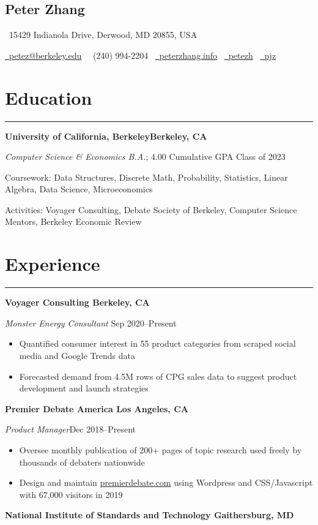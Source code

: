 \documentclass[11pt]{article}
\newcommand{\name}[1]{\begin{center}\section*{\huge \color{highlight} #1}\vspace{-0.5cm}\end{center}}
\newcommand{\topinfo}[1]{\begin{center}\vspace{-0.3cm}#1\vspace{-0.2cm}\end{center}}
\newcommand{\resumesection}[1]{\vspace{-0.6cm}\section*{\color{highlight}#1}\vspace{-0.3cm}\hrule\vspace{0.2cm}}
\begin{document}
\name{Peter Zhang}
\topinfo{\faHome \ 15429 Indianola Drive, Derwood, MD 20855, USA}
\topinfo{\href{mailto:petez@berkeley.edu}{\faEnvelope \ petez@berkeley.edu} \ \faPhone \ (240) 994-2204 \ \href{https://peterzhang.info/}{\faBriefcase \ peterzhang.info} \  \href{https://github.com/petezh}{\faGithub \ petezh} \  \href{https://www.linkedin.com/in/pjz/}{\faLinkedinSquare \ pjz}}

\resumesection{Education}

\textbf{University of California, Berkeley\hfill Berkeley, CA} \par
\textit{Computer Science \& Economics B.A.}; 4.00 Cumulative GPA \hfill Class of 2023\par
Coursework: Data Structures, Discrete Math, Probability, Statistics, Linear Algebra, Data Science, Microeconomics\par
Activities: Voyager Consulting, Debate Society of Berkeley, Computer Science Mentors, Berkeley Economic Review

\resumesection{Experience}

\textbf{Voyager Consulting \hfill Berkeley, CA}\par

\textit{Monster Energy Consultant} \hfill Sep 2020--Present
\begin{itemize}
	\item Quantified consumer interest in 55 product categories from scraped social media and Google Trends data
	\item Forecasted demand from 4.5M rows of CPG sales data to suggest product development and launch strategies
\end{itemize}\par

\textbf{Premier Debate America \hfill Los Angeles, CA} \par

\textit{Product Manager}\hfill Dec 2018--Present
\begin{itemize}
	\item Oversee monthly publication of 200+ pages of topic research used freely by thousands of debaters nationwide
	\item Design and maintain \href{https://www.premierdebate.com/briefs/}{premierdebate.com} using Wordpress and CSS/Javascript with 67,000 visitors in 2019
\end{itemize}\vspace{0.1cm}


\textbf{National Institute of Standards and Technology \hfill Gaithersburg, MD}\par
\end{document}
